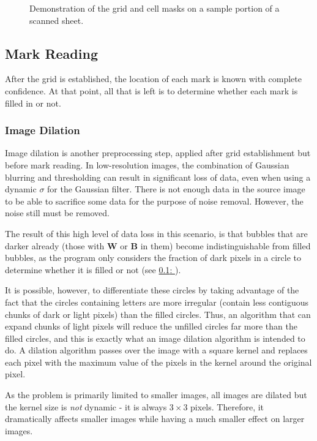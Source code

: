 \documentclass[12pt, letterpaper]{report}
\newcommand*{\sectref}[1]{\hyperref[{#1}]{\ref*{#1}: \nameref*{#1}}}
\newcommand*{\boxedimage}[1]{\fbox{\texttt{[image: img/\#1]}}}
\newcommand{\fig}[3]{
  \begin{figure}[!htbp]
    \caption{#1}
    \label{#3}
    \centering
    \boxedimage{#2}
  \end{figure}
}
\begin{document}
\fig{Demonstration of the grid and cell masks on a sample portion of a scanned sheet.}{sample/grid.jpg}{fig:samplegrid}

\subsection{Mark Reading}
\label{sect:reading}

After the grid is established, the location of each mark is known with complete
confidence. At that point, all that is left is to determine whether each mark
is filled in or not.

\subsubsection{Image Dilation}
Image dilation is another preprocessing step, applied after grid establishment
but before mark reading.
In low-resolution images, the combination of Gaussian blurring and thresholding
can result in significant loss of data, even when using a dynamic $\sigma$ for
the Gaussian filter. There is not enough data in the source image to be able to
sacrifice some data for the purpose of noise removal. However, the noise still
must be removed.

The result of this high level of data loss in this scenario, is that bubbles
that are darker already (those with \textbf{W} or \textbf{B} in them) become
indistinguishable from filled bubbles, as the program only considers the
fraction of dark pixels in a circle to determine whether it is filled or not
(see \sectref{sect:reading}).

It is possible, however, to differentiate these
circles by taking advantage of the fact that the circles containing letters are
more irregular (contain less contiguous chunks of dark or light pixels) than the
filled circles. Thus, an algorithm that can expand chunks of light pixels will
reduce the unfilled circles far more than the filled circles, and this is exactly
what an image dilation algorithm is intended to do. A dilation algorithm passes
over the image with a square kernel and replaces each pixel with the maximum value
of the pixels in the kernel around the original pixel.

As the problem is primarily limited to smaller images, all images are dilated
but the kernel size is \textit{not} dynamic - it is always $3\times3$ pixels.
Therefore, it dramatically affects smaller images while having a much smaller
effect on larger images.
\end{document}
